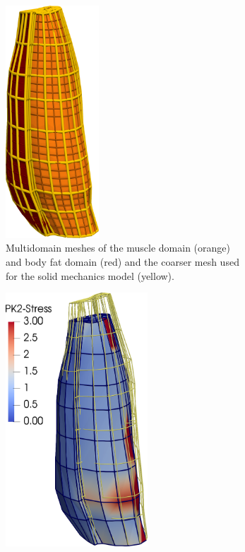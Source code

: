 


\begin{figure}
  \centering%
  \hfill
  \begin{subfigure}[t]{0.31\textwidth}%
    \centering%
    \includegraphics[height=87mm]{images/results/application/multidomain_prestretch5.png}%
    \caption{Multidomain meshes of the muscle domain (orange) and body fat domain (red) and the coarser mesh used for the solid mechanics model (yellow).}%
    \label{fig:multidomain_prestretch5}%
  \end{subfigure}
  \begin{subfigure}[t]{0.31\textwidth}%
    \centering%
    \includegraphics[height=95mm]{images/results/application/multidomain_prestretch6.png}%

\end{subfigure}
\end{figure}
